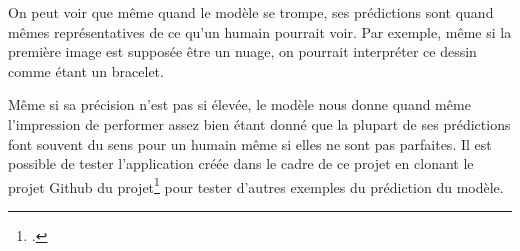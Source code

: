 On peut voir que même quand le modèle se trompe, ses prédictions sont quand mêmes représentatives de ce qu'un humain pourrait voir.
Par exemple, même si la première image est supposée être un nuage, on pourrait interpréter ce dessin comme étant un bracelet.


Même si sa précision n'est pas si élevée, le modèle nous donne quand même l'impression de performer assez bien étant donné que la plupart de ses prédictions font souvent du sens pour un humain même si elles ne sont pas parfaites.
Il est possible de tester l'application créée dans le cadre de ce projet en clonant le projet Github du projet\footcite{Github:repo} pour tester d'autres exemples du prédiction du modèle.
